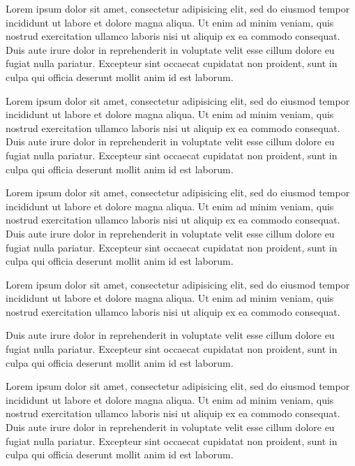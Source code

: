 \documentclass{tcc}
\begin{document}
	Lorem ipsum dolor sit amet, consectetur adipisicing elit, sed do eiusmod
	tempor incididunt ut labore et dolore magna aliqua. Ut enim ad minim veniam,
	quis nostrud exercitation ullamco laboris nisi ut aliquip ex ea commodo
	consequat. Duis aute irure dolor in reprehenderit in voluptate velit esse
	cillum dolore eu fugiat nulla pariatur. Excepteur sint occaecat cupidatat non
	proident, sunt in culpa qui officia deserunt mollit anim id est laborum.

	Lorem ipsum dolor sit amet, consectetur adipisicing elit, sed do eiusmod
	tempor incididunt ut labore et dolore magna aliqua. Ut enim ad minim veniam,
	quis nostrud exercitation ullamco laboris nisi ut aliquip ex ea commodo
	consequat. Duis aute irure dolor in reprehenderit in voluptate velit esse
	cillum dolore eu fugiat nulla pariatur. Excepteur sint occaecat cupidatat non
	proident, sunt in culpa qui officia deserunt mollit anim id est laborum.

	Lorem ipsum dolor sit amet, consectetur adipisicing elit, sed do eiusmod
	tempor incididunt ut labore et dolore magna aliqua. Ut enim ad minim veniam,
	quis nostrud exercitation ullamco laboris nisi ut aliquip ex ea commodo
	consequat. Duis aute irure dolor in reprehenderit in voluptate velit esse
	cillum dolore eu fugiat nulla pariatur. Excepteur sint occaecat cupidatat non
	proident, sunt in culpa qui officia deserunt mollit anim id est laborum.

	Lorem ipsum dolor sit amet, consectetur adipisicing elit, sed do eiusmod
	tempor incididunt ut labore et dolore magna aliqua. Ut enim ad minim veniam,
	quis nostrud exercitation ullamco laboris nisi ut aliquip ex ea commodo
	consequat.

	

	 Duis aute irure dolor in reprehenderit in voluptate velit esse
	cillum dolore eu fugiat nulla pariatur. Excepteur sint occaecat cupidatat non
	proident, sunt in culpa qui officia deserunt mollit anim id est laborum.

	Lorem ipsum dolor sit amet, consectetur adipisicing elit, sed do eiusmod
	tempor incididunt ut labore et dolore magna aliqua. Ut enim ad minim veniam,
	quis nostrud exercitation ullamco laboris nisi ut aliquip ex ea commodo
	consequat. Duis aute irure dolor in reprehenderit in voluptate velit esse
	cillum dolore eu fugiat nulla pariatur. Excepteur sint occaecat cupidatat non
	proident, sunt in culpa qui officia deserunt mollit anim id est laborum.

\end{document}
